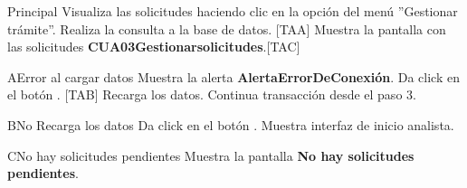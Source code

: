 \begin{UCtrayectoria}{Principal}
  \UCpaso[\UCactor] Visualiza las solicitudes haciendo clic en la opción del menú ''Gestionar trámite''.
  \UCpaso Realiza la consulta a la base de datos. [TAA]
  \UCpaso Muestra la pantalla con las solicitudes {\bf CUA03Gestionarsolicitudes}.[TAC]
\end{UCtrayectoria}

\begin{UCtrayectoriaA}{A}{Error al cargar datos} 
\UCpaso Muestra la alerta {\bf AlertaErrorDeConexión}.
  \UCpaso[\UCactor] Da click en el botón . [TAB]
  \UCpaso Recarga los datos.
  \UCpaso Continua transacción desde el paso 3.
\end{UCtrayectoriaA}

\begin{UCtrayectoriaA}{B}{No Recarga los datos} 
  \UCpaso Da click en el botón .
  \UCpaso Muestra interfaz de inicio analista.
\end{UCtrayectoriaA}

\begin{UCtrayectoriaA}{C}{No hay solicitudes pendientes} 
  \UCpaso Muestra la pantalla {\bf No hay solicitudes pendientes}.
\end{UCtrayectoriaA}

